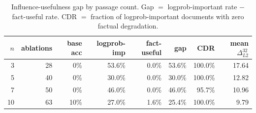 \begin{table}[h]
\centering\small
\begin{tabular}{rrrrrrrr}
\toprule
$n$ & ablations & base acc & logprob-imp & fact-useful & gap & CDR & mean $\Delta_{L2}^{32}$ \\
\midrule
  3 & 28 & 0\% & 53.6\% & 0.0\% & 53.6\% & 100.0\% & 17.64 \\
  5 & 40 & 0\% & 30.0\% & 0.0\% & 30.0\% & 100.0\% & 12.82 \\
  7 & 50 & 0\% & 46.0\% & 0.0\% & 46.0\% & 95.7\% & 10.96 \\
  10 & 63 & 10\% & 27.0\% & 1.6\% & 25.4\% & 100.0\% & 9.79 \\
\bottomrule
\end{tabular}
\caption{Influence-usefulness gap by passage count. Gap $=$ logprob-important rate $-$ fact-useful rate. CDR $=$ fraction of logprob-important documents with zero factual degradation.}
\label{tab:e5_passage_gap}
\end{table}
